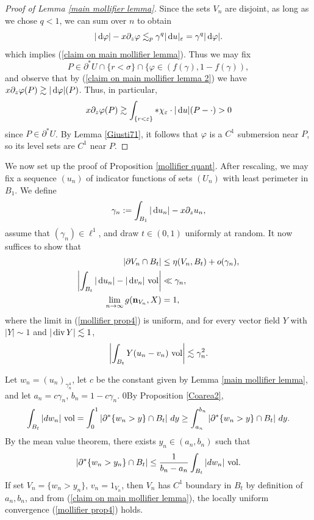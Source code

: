 \begin{proof}[Proof of Lemma \ref{main mollifier lemma}]
Since the sets $V_n$ are disjoint, as long as we chose $q < 1$, we can sum over $n$ to obtain
\begin{equation}\label{claim on main mollifier lemma 2}
|\mathop{}\!\mathrm{d} \varphi| - x\partial_z\varphi \lesssim_p \gamma^q |\mathop{}\!\mathrm{d} u|_\varepsilon = \gamma^q |\mathop{}\!\mathrm{d} \varphi|.
\end{equation}
which implies (\ref{claim on main mollifier lemma}). Thus we may fix
$$P \in \partial^* U \cap \{r < \sigma\} \cap \{\varphi \in (f(\gamma), 1 - f(\gamma)),$$
and observe that by (\ref{claim on main mollifier lemma 2}) we have $x\partial_z \varphi(P) \gtrsim |\mathop{}\!\mathrm{d} \varphi|(P)$.
Thus, in particular,
$$x\partial_z \varphi(P) \gtrsim \int_{\{r < \varepsilon\}} *\chi_\varepsilon \cdot |\mathop{}\!\mathrm{d} u|(P - \cdot) > 0$$
since $P \in \partial^* U$.
By Lemma \ref{Giusti71}, it follows that $\varphi$ is a $C^1$ submersion near $P$, so its level sets are $C^1$ near $P$.
\end{proof}

We now set up the proof of Proposition \ref{mollifier quant}.
After rescaling, we may fix a sequence $(u_n)$ of indicator functions of sets $(U_n)$ with least perimeter in $B_1$.
We define
$$\gamma_n := \int_{B_1} |\mathop{}\!\mathrm{d} u_n| - x\partial_z u_n,$$
assume that $(\gamma_n) \in \ell^1$, and draw $t \in (0, 1)$ uniformly at random.
It now suffices to show that
\begin{align}
|\partial V_n \cap B_t| &\leq \eta(V_n, B_t) + o(\gamma_n), \label{mollifier prop1}\\
\left|\int_{B_t} |\mathop{}\!\mathrm{d} u_n| - |\mathop{}\!\mathrm{d} v_n| ~\mathrm{vol}\right| &\ll \gamma_n, \label{mollifier prop2}\\
\lim_{n \to \infty} g(\mathbf n_{V_n}, X) &= 1, \label{mollifier prop4}
\end{align}
where the limit in (\ref{mollifier prop4}) is uniform, and for every vector field $Y$ with $|Y| \sim 1$ and $|\operatorname{div} Y| \lesssim 1$,
\begin{equation}
\left|\int_{B_t} Y(u_n - v_n)~\mathrm{vol}\right| \lesssim \gamma_n^2. \label{mollifier prop3}
\end{equation}

Let $w_n = (u_n)_{\gamma_n^4}$, let $c$ be the constant given by Lemma \ref{main mollifier lemma}, and let $a_n = c\gamma_n$, $b_n = 1 - c\gamma_n$.
0By Proposition \ref{Coarea2},
$$\int_{B_t} |dw_n| ~\mathrm{vol} = \int_0^1 |\partial^* \{w_n > y\} \cap B_t| ~dy \geq \int_{a_n}^{b_n} |\partial^* \{w_n > y\} \cap B_t| ~dy.$$
By the mean value theorem, there exists $y_n \in (a_n, b_n)$ such that
\begin{equation}\label{MVT mollifier}
|\partial^* \{w_n > y_n\} \cap B_t| \leq \frac{1}{b_n - a_n} \int_{B_t} |dw_n| ~\mathrm{vol}.
\end{equation}
If set $V_n = \{w_n > y_n\}$, $v_n = 1_{V_n}$, then $V_n$ has $C^1$ boundary in $B_t$ by definition of $a_n, b_n$, and from (\ref{claim on main mollifier lemma}), the locally uniform convergence (\ref{mollifier prop4}) holds.


